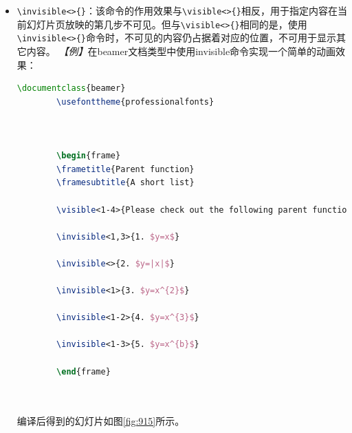 \begin{itemize}
    \item \texttt{\textbackslash{}invisible<>\{\}}：该命令的作用效果与\texttt{\textbackslash{}visible<>\{\}}相反，用于指定内容在当前幻灯片页放映的第几步不可见。但与\texttt{\textbackslash{}visible<>\{\}}相同的是，使用\texttt{\textbackslash{}invisible<>\{\}}命令时，不可见的内容仍占据着对应的位置，不可用于显示其它内容。
          \emph{【例】}在beamer文档类型中使用invisible命令实现一个简单的动画效果：
          \begin{lstlisting}[language=TeX]
        \documentclass{beamer}
        \usefonttheme{professionalfonts}

        

        \begin{frame}
        \frametitle{Parent function}
        \framesubtitle{A short list}

        \visible<1-4>{Please check out the following parent function list.}

        \invisible<1,3>{1. $y=x$}

        \invisible<>{2. $y=|x|$}

        \invisible<1>{3. $y=x^{2}$}

        \invisible<1-2>{4. $y=x^{3}$}

        \invisible<1-3>{5. $y=x^{b}$}

        \end{frame}

        
    \end{lstlisting}

          编译后得到的幻灯片如图\ref{fig:915}所示。


\end{itemize}
